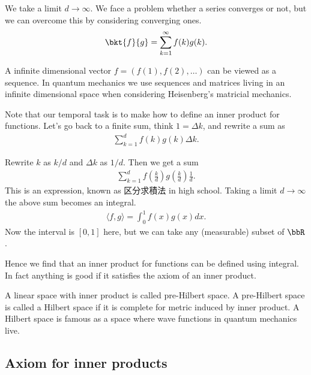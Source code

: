 \documentclass[openany, a4paper, oneside]{jsbook}
\begin{document}
We take a limit $d \to \infty$.
We face a problem whether a series converges or not,
but we can overcome this by considering converging ones.
\begin{align}
 \bkt{f}{g}
 =
 \sum_{k=1}^{\infty} f(k)g(k).
\end{align}

\begin{rem}
 A infinite dimensional vector $f = (f(1), f(2), \dots)$
 can be viewed as a sequence.
 In quantum mechanics we use sequences and matrices living in an infinite dimensional space
 when considering Heisenberg's matricial mechanics.
\end{rem}

Note that our temporal task is to make how to define an inner product for functions.
Let's go back to a finite sum, think $1 = \Delta k$, and rewrite a sum as
\begin{align}
 \sum_{k=1}^{d} f(k)g(k) \Delta k.
\end{align}

Rewrite $k$ as $k/d$ and $\Delta k$ as $1/d$.
Then we get a sum
\begin{align}
 \sum_{k=1}^{d} f \left( \frac{k}{d} \right) g \left( \frac{k}{d} \right) \frac{1}{d}.
\end{align}
This is an expression, known as 区分求積法 in high school\footnotemark[6]{}.
Taking a limit $d \to \infty$ the above sum becomes an integral.
\begin{align}
 \langle f, g \rangle
 =
 \int_{0}^{1} f(x) g(x) dx.
\end{align}
Now the interval is $[0, 1]$ here,
but we can take any (measurable) subset of $\bbR$.

Hence we find that an inner product for functions
can be defined using integral.
In fact anything is good if it satisfies the axiom of an inner product.

A linear space with inner product is called pre-Hilbert space.
A pre-Hilbert space is called a Hilbert space if it is complete for metric induced by inner product.
A Hilbert space is famous as a space where wave functions in quantum mechanics live.
\subsection{Axiom for inner products}
\end{document}
